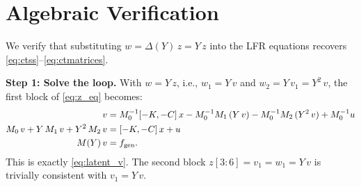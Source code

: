 \documentclass[11pt]{article}
\begin{document}
\section{Algebraic Verification}
\label{sec:verify}

We verify that substituting $w = \Delta(Y)\,z = Y\,z$ into the LFR equations
recovers \eqref{eq:ctss}--\eqref{eq:ctmatrices}.

\medskip
\noindent\textbf{Step 1: Solve the loop.}
With $w = Y\,z$, i.e., $w_1 = Y\,v$ and $w_2 = Y\,v_1 = Y^2\,v$,
the first block of \eqref{eq:z_eq} becomes:
\begin{align}
    v &= M_0^{-1}[-K,-C]\,x
        - M_0^{-1}M_1\,(Y\,v)
        - M_0^{-1}M_2\,(Y^2\,v)
        + M_0^{-1}u \notag\\
    M_0\,v + Y\,M_1\,v + Y^2\,M_2\,v &= [-K,-C]\,x + u \notag\\
    M(Y)\,v &= f_\mathrm{gen}. \label{eq:loop_check}
\end{align}
This is exactly \eqref{eq:latent_v}. The second block $z[3{:}6] = v_1 = w_1 = Y\,v$
is trivially consistent with $v_1 = Y\,v$.
\end{document}
